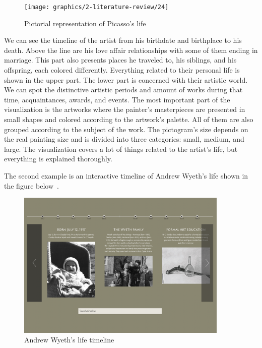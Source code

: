 \begin{figure}[hbt!]
    \begin{center}
        \texttt{[image: graphics/2-literature-review/24]}
    \end{center}
    \caption{Pictorial representation of Picasso's life}
    \label{fig:figure2.24}
\end{figure}

\clearpage

We can see the timeline of the artist from his birthdate and birthplace to his death. Above the line are his love affair relationships with
some of them ending in marriage. This part also presents places he traveled to, his siblings, and his offspring, each colored
differently. Everything related to their personal life is shown in the upper part. The lower part is concerned with their artistic world. We
can spot the distinctive artistic periods and amount of works during that time, acquaintances, awards, and events. The most important part of
the visualization is the artworks where the painter’s masterpieces are presented in small shapes and colored according to the artwork’s
palette. All of them are also grouped according to the subject of the work. The pictogram’s size depends on the real painting size and is
divided into three categories: small, medium, and large. The visualization covers a lot of things related to the artist’s life, but everything
is explained thoroughly.

The second example is an interactive timeline of Andrew Wyeth’s life shown in the figure below~\citep{wyeth_2021}.

\begin{figure}[hbt!]
    \begin{center}
        \includegraphics[width=0.9\textwidth]{graphics/2-literature-review/25}
    \end{center}
    \caption{Andrew Wyeth’s life timeline}
    \label{fig:figure2.25}
\end{figure}


